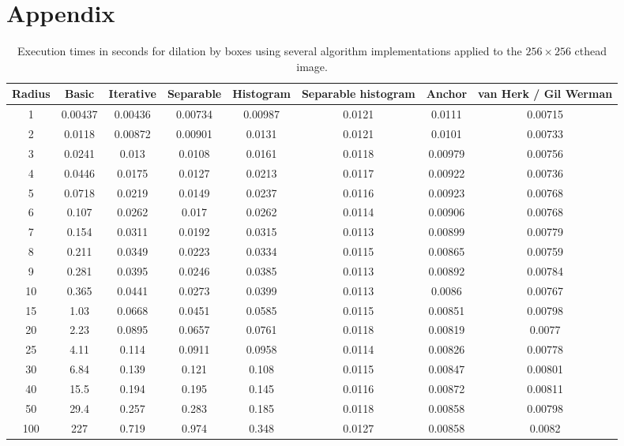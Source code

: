 \documentclass[a4paper]{InsightArticle}
\begin{document}


\nocite{ITKSoftwareGuide}

\appendix
\section*{Appendix}

\begin{table}[phtb]
\centering
\small
\begin{tabular}{cccccccc}
\hline
Radius	&	Basic	&	Iterative	&	Separable	&	Histogram	&	Separable histogram	&	Anchor	&	van Herk / Gil Werman	\\
\hline
1	&	0.00437	&	0.00436	&	0.00734	&	0.00987	&	0.0121	&	0.0111	&	0.00715	\\
2	&	0.0118	&	0.00872	&	0.00901	&	0.0131	&	0.0121	&	0.0101	&	0.00733	\\
3	&	0.0241	&	0.013	&	0.0108	&	0.0161	&	0.0118	&	0.00979	&	0.00756	\\
4	&	0.0446	&	0.0175	&	0.0127	&	0.0213	&	0.0117	&	0.00922	&	0.00736	\\
5	&	0.0718	&	0.0219	&	0.0149	&	0.0237	&	0.0116	&	0.00923	&	0.00768	\\
6	&	0.107	&	0.0262	&	0.017	&	0.0262	&	0.0114	&	0.00906	&	0.00768	\\
7	&	0.154	&	0.0311	&	0.0192	&	0.0315	&	0.0113	&	0.00899	&	0.00779	\\
8	&	0.211	&	0.0349	&	0.0223	&	0.0334	&	0.0115	&	0.00865	&	0.00759	\\
9	&	0.281	&	0.0395	&	0.0246	&	0.0385	&	0.0113	&	0.00892	&	0.00784	\\
10	&	0.365	&	0.0441	&	0.0273	&	0.0399	&	0.0113	&	0.0086	&	0.00767	\\
15	&	1.03	&	0.0668	&	0.0451	&	0.0585	&	0.0115	&	0.00851	&	0.00798	\\
20	&	2.23	&	0.0895	&	0.0657	&	0.0761	&	0.0118	&	0.00819	&	0.0077	\\
25	&	4.11	&	0.114	&	0.0911	&	0.0958	&	0.0114	&	0.00826	&	0.00778	\\
30	&	6.84	&	0.139	&	0.121	&	0.108	&	0.0115	&	0.00847	&	0.00801	\\
40	&	15.5	&	0.194	&	0.195	&	0.145	&	0.0116	&	0.00872	&	0.00811	\\
50	&	29.4	&	0.257	&	0.283	&	0.185	&	0.0118	&	0.00858	&	0.00798	\\
100	&	227	&	0.719	&	0.974	&	0.348	&	0.0127	&	0.00858	&	0.0082	\\
\hline
\hline
\end{tabular}
\caption{Execution times in seconds for dilation by boxes using several algorithm implementations applied to the $256 \times 256$ cthead image.\label{tab:perfDilation}}
\end{table}
\end{document}
